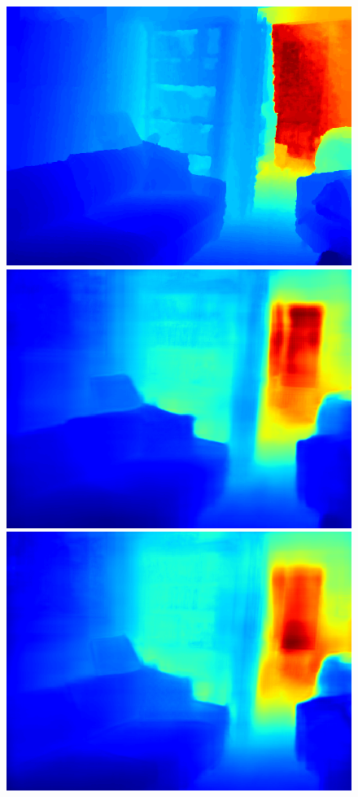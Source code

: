 \documentclass{svjour3}                     %
\begin{document}
\begin{figure}[t]
{\begin{minipage}[t]{0.15\linewidth}
  \includegraphics[width=1\linewidth]{images/nyu_gt/170.png}
  \includegraphics[width=1\linewidth]{images/nyu_result/bedroom_rgb_00170.png}
  \includegraphics[width=1\linewidth]{images/nyu_without/bedroom_rgb_00170.png}

\end{minipage}}
\end{figure}
\end{document}
